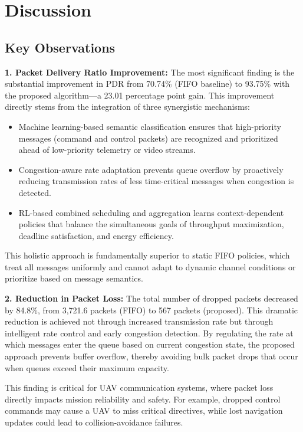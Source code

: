 \documentclass[pdflatex,sn-mathphys-num]{sn-jnl}%
\theoremstyle{thmstyleone}%
\theoremstyle{thmstyletwo}%
\theoremstyle{thmstylethree}%
\begin{document}
\section{ Discussion }

\subsection{ Key Observations }

\textbf{1. Packet Delivery Ratio Improvement:} The most significant finding is the substantial improvement in PDR from 70.74\% (FIFO baseline) to 93.75\% with the proposed algorithm—a 23.01 percentage point gain. This improvement directly stems from the integration of three synergistic mechanisms:

\begin{itemize}
    \item Machine learning-based semantic classification ensures that high-priority messages (command and control packets) are recognized and prioritized ahead of low-priority telemetry or video streams.
    \item Congestion-aware rate adaptation prevents queue overflow by proactively reducing transmission rates of less time-critical messages when congestion is detected.
    \item RL-based combined scheduling and aggregation learns context-dependent policies that balance the simultaneous goals of throughput maximization, deadline satisfaction, and energy efficiency.
\end{itemize}

This holistic approach is fundamentally superior to static FIFO policies, which treat all messages uniformly and cannot adapt to dynamic channel conditions or prioritize based on message semantics.

\textbf{2. Reduction in Packet Loss:} The total number of dropped packets decreased by 84.8\%, from 3,721.6 packets (FIFO) to 567 packets (proposed). This dramatic reduction is achieved not through increased transmission rate but through intelligent rate control and early congestion detection. By regulating the rate at which messages enter the queue based on current congestion state, the proposed approach prevents buffer overflow, thereby avoiding bulk packet drops that occur when queues exceed their maximum capacity.

This finding is critical for UAV communication systems, where packet loss directly impacts mission reliability and safety. For example, dropped control commands may cause a UAV to miss critical directives, while lost navigation updates could lead to collision-avoidance failures.
\end{document}
